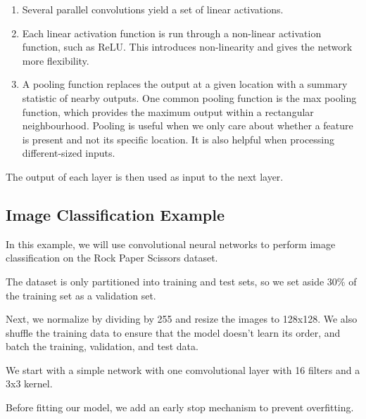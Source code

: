 \documentclass{article}
\begin{document}
\begin{enumerate}
    \item Several parallel convolutions yield a set of linear activations.
    \item Each linear activation function is run through a non-linear activation function, such as ReLU. This introduces non-linearity and gives the network more flexibility. %
    \item A pooling function replaces the output at a given location with a summary statistic of nearby outputs. One common pooling function is the max pooling function, which provides the maximum output within a rectangular neighbourhood. Pooling is useful when we only care about whether a feature is present and not its specific location. It is also helpful when processing different-sized inputs.
\end{enumerate}

The output of each layer is then used as input to the next layer.

\subsection{Image Classification Example}

In this example, we will use convolutional neural networks to perform image classification on the Rock Paper Scissors dataset. 



The dataset is only partitioned into training and test sets, so we set aside 30\% of the training set as a validation set.



Next, we normalize by dividing by 255 and resize the images to 128x128. We also shuffle the training data to ensure that the model doesn't learn its order, and batch the training, validation, and test data.



We start with a simple network with one comvolutional layer with 16 filters and a 3x3 kernel.



Before fitting our model, we add an early stop mechanism to prevent overfitting.
\end{document}
